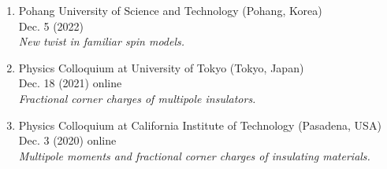 \documentclass[letterpaper,11pt]{article}
\begin{document}
\begin{enumerate}
\setcounter{enumi}{0}
\section*{Colloquium Talks}
\item
Pohang University of Science and Technology (Pohang, Korea)\\
Dec. 5 (2022)\\
\emph{New twist in familiar spin models.}

\item
Physics Colloquium at University of Tokyo (Tokyo, Japan)\\
Dec. 18 (2021) online\\
\emph{Fractional corner charges of multipole insulators.}

\item
Physics Colloquium at California Institute of Technology (Pasadena, USA)\\
Dec. 3 (2020) online\\
\emph{Multipole moments and fractional corner charges of insulating materials.}


\end{enumerate}
\end{document}
